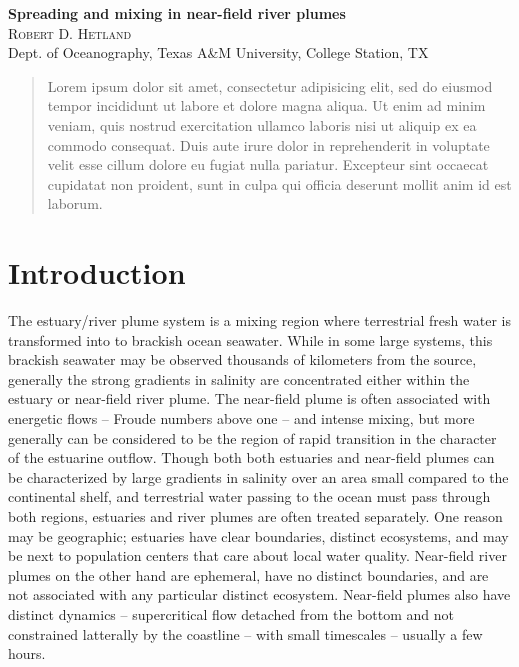 \documentclass[12pt]{article}
\begin{document}
\vfill
\noindent
{\large\bfseries Spreading and mixing in near-field river plumes}\\
\noindent
{\scshape Robert D. Hetland}\\
\noindent
{\footnotesize Dept. of Oceanography, Texas A\&M University, College Station, TX}


\begin{abstract}
  \small{Lorem ipsum dolor sit amet, consectetur adipisicing elit, sed do eiusmod tempor incididunt ut labore et dolore magna aliqua. Ut enim ad minim veniam, quis nostrud exercitation ullamco laboris nisi ut aliquip ex ea commodo consequat. Duis aute irure dolor in reprehenderit in voluptate velit esse cillum dolore eu fugiat nulla pariatur. Excepteur sint occaecat cupidatat non proident, sunt in culpa qui officia deserunt mollit anim id est laborum.}
\end{abstract}


\section{Introduction}

The estuary/river plume system is a mixing region where terrestrial fresh water is transformed into to brackish ocean seawater. While in some large systems, this brackish seawater may be observed thousands of kilometers from the source, generally the strong gradients in salinity are concentrated either within the estuary or near-field river plume. The near-field plume is often associated with energetic flows -- Froude numbers above one -- and intense mixing, but more generally can be considered to be the region of rapid transition in the character of the estuarine outflow. Though both both estuaries and near-field plumes can be characterized by large gradients in salinity over an area small compared to the continental shelf, and terrestrial water passing to the ocean must pass through both regions, estuaries and river plumes are often treated separately. One reason may be geographic; estuaries have clear boundaries, distinct ecosystems, and may be next to population centers that care about local water quality. Near-field river plumes on the other hand are ephemeral, have no distinct boundaries, and are not associated with any particular distinct ecosystem. Near-field plumes also have distinct dynamics -- supercritical flow detached from the bottom and not constrained latterally by the coastline -- with small timescales -- usually a few hours.
\end{document}
